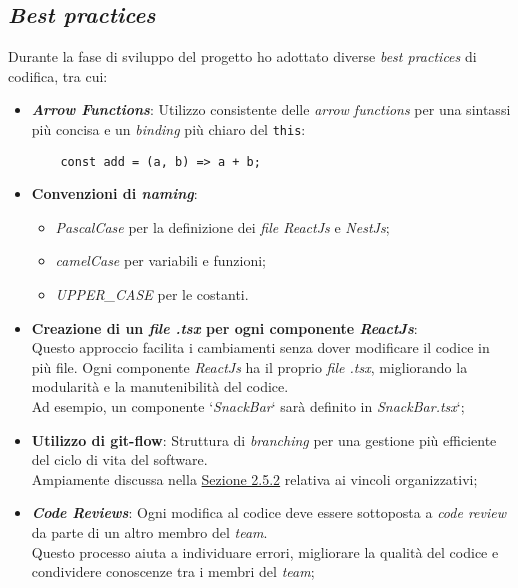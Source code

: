 \subsection{\textit{Best practices}}
\label{sez:best-practices}

Durante la fase di sviluppo del progetto ho adottato diverse \textit{best practices} di codifica, tra cui:

\begin{itemize}
    \item \textbf{\textit{Arrow Functions}}: Utilizzo consistente delle \textit{arrow functions} per una sintassi più concisa e un \textit{binding} più chiaro del \texttt{this}:
    \begin{verbatim}
    const add = (a, b) => a + b;
     \end{verbatim}
    \item \textbf{Convenzioni di \textit{naming}}: 
    \begin{itemize}
        \item \textit{PascalCase} per la definizione dei \textit{file ReactJs} e \textit{NestJs};
        \item \textit{camelCase} per variabili e funzioni;
        \item \textit{UPPER\_CASE} per le costanti.
    \end{itemize}

    \item \textbf{Creazione di un \textit{file .tsx} per ogni componente \textit{ReactJs}}:\\
    Questo approccio facilita i cambiamenti senza dover modificare il codice in più file. 
    Ogni componente \textit{ReactJs} ha il proprio \textit{file .tsx}, migliorando la modularità e la manutenibilità del codice.\\
    Ad esempio, un componente ‘\textit{SnackBar}‘ sarà definito in \textit{SnackBar.tsx}‘;
    
    \item \textbf{Utilizzo di \gls{git-flow}}: Struttura di \textit{branching} per una gestione più efficiente del ciclo di vita del software.\\
    Ampiamente discussa nella {\hyperref[subsec:vincoli-organizzativi]{Sezione 2.5.2}} relativa ai vincoli organizzativi;

    \item \textbf{\textit{Code Reviews}}: Ogni modifica al codice deve essere sottoposta a \textit{code review} da parte di un altro membro del \textit{team}.\\
    Questo processo aiuta a individuare errori, migliorare la qualità del codice e condividere conoscenze tra i membri del \textit{team};    
\end{itemize}

